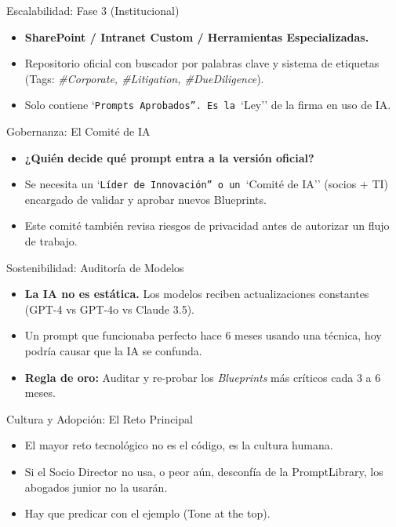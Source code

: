 \documentclass[aspectratio=169]{beamer}
\begin{document}
\begin{frame}{Escalabilidad: Fase 3 (Institucional)}

\begin{itemize}
  \item \textbf{SharePoint / Intranet Custom / Herramientas Especializadas.}
  \item Repositorio oficial con buscador por palabras clave y sistema de etiquetas (Tags: \textit{\#Corporate, \#Litigation, \#DueDiligence}).
  \item Solo contiene `\texttt{Prompts Aprobados''. Es la }`Ley'' de la firma en uso de IA.
\end{itemize}
\end{frame}

\begin{frame}{Gobernanza: El Comité de IA}

\begin{itemize}
  \item \textbf{¿Quién decide qué prompt entra a la versión oficial?}
  \item Se necesita un `\texttt{Líder de Innovación'' o un }`Comité de IA'' (socios + TI) encargado de validar y aprobar nuevos Blueprints.
  \item Este comité también revisa riesgos de privacidad antes de autorizar un flujo de trabajo.
\end{itemize}
\end{frame}

\begin{frame}{Sostenibilidad: Auditoría de Modelos}

\begin{itemize}
  \item \textbf{La IA no es estática.} Los modelos reciben actualizaciones constantes (GPT-4 vs GPT-4o vs Claude 3.5).
  \item Un prompt que funcionaba perfecto hace 6 meses usando una técnica, hoy podría causar que la IA se confunda.
  \item \textbf{Regla de oro:} Auditar y re-probar los \textit{Blueprints} más críticos cada 3 a 6 meses.
\end{itemize}
\end{frame}

\begin{frame}{Cultura y Adopción: El Reto Principal}

\begin{itemize}
  \item El mayor reto tecnológico no es el código, es la cultura humana.
  \item Si el Socio Director no usa, o peor aún, desconfía de la PromptLibrary, los abogados junior no la usarán.
  \item Hay que predicar con el ejemplo (Tone at the top).
\end{itemize}
\end{frame}
\end{document}
